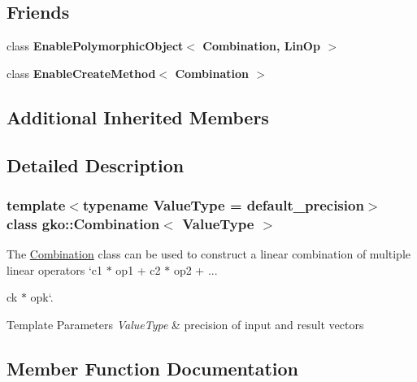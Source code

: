 \subsection*{Friends}
\begin{DoxyCompactItemize}
\item 
\mbox{\label{classgko_1_1Combination_ae096eca62ea7e5640d99ece073cf1194}} 
class {\bfseries Enable\+Polymorphic\+Object$<$ Combination, Lin\+Op $>$}
\item 
\mbox{\label{classgko_1_1Combination_a54ec531b3585ab2f8572e20e3bebb9d1}} 
class {\bfseries Enable\+Create\+Method$<$ Combination $>$}
\end{DoxyCompactItemize}
\subsection*{Additional Inherited Members}


\subsection{Detailed Description}
\subsubsection*{template$<$typename Value\+Type = default\+\_\+precision$>$\newline
class gko\+::\+Combination$<$ Value\+Type $>$}

The \hyperlink{classgko_1_1Combination}{Combination} class can be used to construct a linear combination of multiple linear operators `c1 $\ast$ op1 + c2 $\ast$ op2 + ... 


\begin{DoxyItemize}
\item ck $\ast$ opk`.
\end{DoxyItemize}


\begin{DoxyTemplParams}{Template Parameters}
{\em Value\+Type} & precision of input and result vectors \\
\hline
\end{DoxyTemplParams}


\subsection{Member Function Documentation}
\mbox{\label{classgko_1_1Combination_ad5844423c39d70ee90d5dc432c83261f}} 
